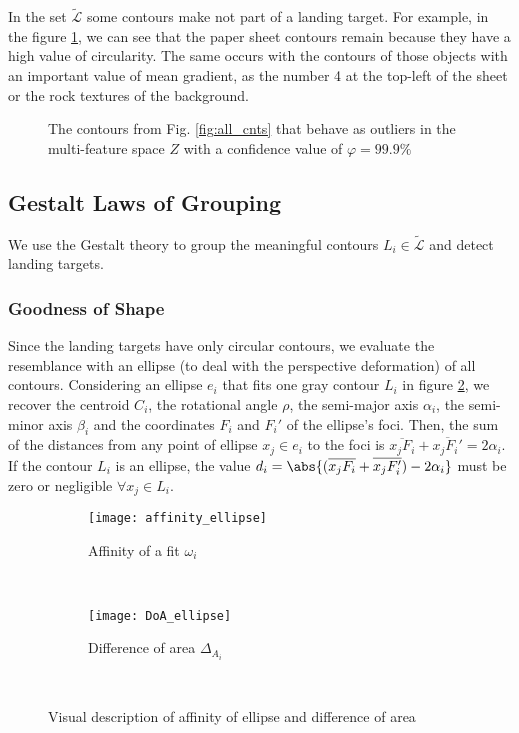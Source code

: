 In the set $\widetilde{\mathcal{L}}$ some contours make not part of a landing target. For example, in the figure \ref{fig:rx_cnts}, we can see that the paper sheet contours remain because they have a high value of circularity. The same occurs with the contours of those objects with an important value of mean gradient, as the number 4 at the top-left of the sheet or the rock textures of the background.
\begin{figure}[!ht]
    \centering
    \caption{The contours from Fig. \ref{fig:all_cnts} that behave as outliers in the multi-feature space $Z$ with a confidence value of $\varphi=99.9\%$}
    \label{fig:rx_cnts}
\end{figure}

\subsection{Gestalt Laws of Grouping}\label{subsec:Gestalt}
We use the Gestalt theory \citep{Wertheimer:Psycologische:1923} to group the meaningful contours $L_{i}\in \widetilde{\mathcal{L}}$ and detect landing targets.

\subsubsection{Goodness of Shape}\label{subsec:similarity}
Since the landing targets have only circular contours, we evaluate the resemblance with an ellipse (to deal with the perspective deformation) of all contours. Considering an ellipse $e_{i}$ that fits one gray contour $L_{i}$ in figure \ref{fig:affinity}, we recover the centroid $C_{i}$, the rotational angle $\rho$, the semi-major axis $\alpha_i$, the semi-minor axis $\beta_{i}$ and the coordinates $F_{i}$ and $F_{i}'$ of the ellipse's foci. Then, the sum of the distances from any point of ellipse $x_{j}\in e_{i}$ to the foci is $\overline{x_{j}F_{i}}+\overline{x_{j}F_{i}'}=2\alpha_{i}$. If the contour $L_{i}$ is an ellipse, the value $d_{i}=\abs{(\overline{x_{j}F_{i}}+\overline{x_{j}F_{i}'})-2\alpha_{i} }$ must be zero or negligible $\forall x_{j}\in L_{i}$. 

\begin{figure}[h]
    \centering
    \begin{subfigure}[b]{0.4\textwidth}
        \texttt{[image: affinity\_ellipse]}
        \caption{Affinity of a fit $\omega_{i}$}
        \label{fig:affinity}
    \end{subfigure}
    ~ %
    \begin{subfigure}[b]{0.45\textwidth}
        \texttt{[image: DoA\_ellipse]}
        \caption{Difference of area $\Delta_{A_{i}}$}
        \label{fig:DoA}
    \end{subfigure}\\
    \caption{Visual description of affinity of ellipse and difference of area}\label{fig:ressemblance_ellipse}
\end{figure}

